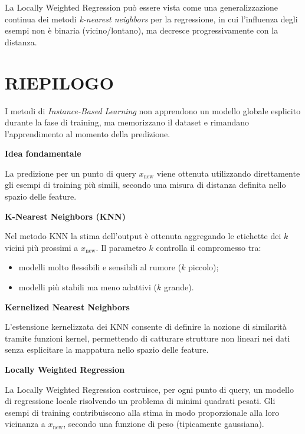 \documentclass[a4paper,12pt]{report}
\begin{document}
La Locally Weighted Regression può essere vista come una generalizzazione
continua dei metodi \emph{k-nearest neighbors} per la regressione, in cui
l’influenza degli esempi non è binaria (vicino/lontano), ma decresce
progressivamente con la distanza.

\section*{RIEPILOGO}

\begin{tcolorbox}[
  colback=green!10!white,
  colframe=green!50!black,
  coltitle=white,
  title=\textbf{Instance-Based Learning – Concetti chiave},
  fonttitle=\bfseries,
  breakable
]

I metodi di \emph{Instance-Based Learning} non apprendono un modello globale
esplicito durante la fase di training, ma memorizzano il dataset e rimandano
l’apprendimento al momento della predizione.

\medskip
\textbf{Idea fondamentale}

La predizione per un punto di query $x_{\text{new}}$ viene ottenuta utilizzando
direttamente gli esempi di training più simili, secondo una misura di distanza
definita nello spazio delle feature.

\medskip
\textbf{K-Nearest Neighbors (KNN)}

Nel metodo KNN la stima dell’output è ottenuta aggregando le etichette dei $k$
vicini più prossimi a $x_{\text{new}}$.
Il parametro $k$ controlla il compromesso tra:
\begin{itemize}
\item modelli molto flessibili e sensibili al rumore ($k$ piccolo);
\item modelli più stabili ma meno adattivi ($k$ grande).
\end{itemize}

\medskip
\textbf{Kernelized Nearest Neighbors}

L’estensione kernelizzata dei KNN consente di definire la nozione di similarità
tramite funzioni kernel, permettendo di catturare strutture non lineari nei dati
senza esplicitare la mappatura nello spazio delle feature.

\medskip
\textbf{Locally Weighted Regression}

La Locally Weighted Regression costruisce, per ogni punto di query, un modello
di regressione locale risolvendo un problema di minimi quadrati pesati.
Gli esempi di training contribuiscono alla stima in modo proporzionale alla loro
vicinanza a $x_{\text{new}}$, secondo una funzione di peso (tipicamente gaussiana).
\end{tcolorbox}
\end{document}
